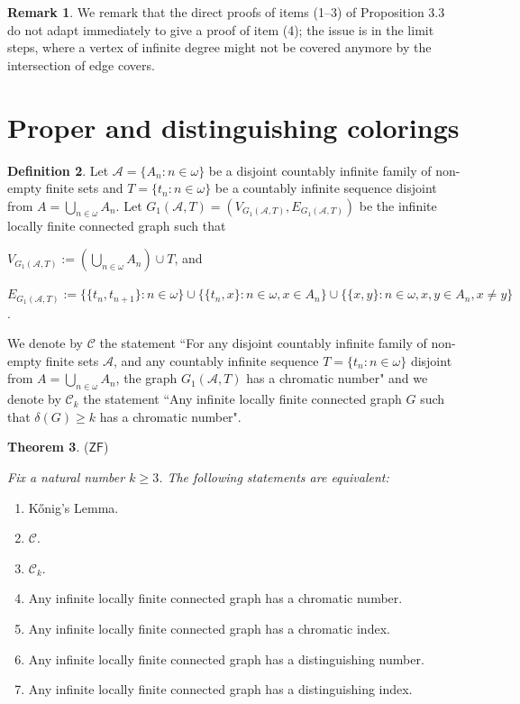 \documentclass[12pt,reqno,a4paper]{amsart}
\theoremstyle{definition}
\newtheorem{defn}{Definition}[section]
\newtheorem{thm}[defn]{Theorem}
\newtheorem{remark}[defn]{Remark}
\begin{document}
	\begin{remark}
		We remark that the direct
		proofs of items (1–3) of  Proposition 3.3 do not adapt immediately to give a proof of item (4);
		the issue is in the limit steps, where a vertex of infinite degree might not be covered
		anymore by the intersection of edge covers.
	\end{remark}
	
	\section{Proper and distinguishing colorings}
	\begin{defn}
		Let $\mathcal{A}=\{A_{n}:n\in\omega\}$ be a disjoint countably infinite family of non-empty finite sets and $T=\{t_{n}:n\in \omega\}$ be a countably infinite sequence disjoint from $A=\bigcup_{n\in\omega}A_{n}$. Let $G_{1}(\mathcal{A},T)=(V_{G_{1}(\mathcal{A},T)}, E_{G_{1}(\mathcal{A},T)})$ be the infinite locally finite connected graph such that
		
		\begin{flushleft}
			$V_{G_{1}(\mathcal{A},T)} := (\bigcup_{n\in \omega}A_{n})\cup T$, and
			
			$E_{G_{1}(\mathcal{A},T)} := \bigg\{\{t_{n}, t_{n+1}\}:{n\in\omega}\bigg\} 
			\cup 
			\bigg\{\{t_{n}, x\}: n\in\omega,x\in A_{n}\bigg\}
			\cup
			\bigg\{\{x,y\}:n\in \omega, x,y\in A_{n}, x\not=y\bigg\}$.
		\end{flushleft} 
	\end{defn}
	
	We denote by $\mathcal{C}$ the statement ``For any disjoint countably infinite family of non-empty finite sets $\mathcal{A}$, and any countably infinite sequence $T=\{t_{n}:n\in \omega\}$ disjoint from $A=\bigcup_{n\in\omega}A_{n}$, the graph $G_{1}(\mathcal{A},T)$ has a chromatic number" and we denote by 
	$\mathcal{C}_{k}$ the statement ``Any infinite locally finite connected graph $G$ such that $\delta(G)\geq k$ has a chromatic number".
	
	\begin{thm}{($\mathsf{ZF}$)}{\em Fix a natural number $k\geq 3$. The following statements are equivalent:
			\begin{enumerate}
				\item K\H{o}nig’s Lemma.
				\item $\mathcal{C}$. 
				\item $\mathcal{C}_{k}$.
				\item Any infinite locally finite connected graph has a chromatic number.
				\item Any infinite locally finite connected graph has a chromatic index.
				\item Any infinite locally finite connected graph has a distinguishing number.
				
				\item Any infinite locally finite connected graph has a distinguishing index.
			\end{enumerate}
		}
	\end{thm}
	
\end{document}
